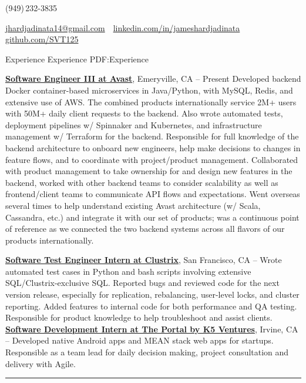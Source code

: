 \documentclass[letterpaper,MMMyyyy,nonstopmode]{simpleresumecv}
\makeatletter
\newcommand{\ResumeAuthor}{James Hardjadinata}
\newcommand{\ResumeWebsite}{github.com/SVT125}
\newcommand{\ResumeLinkedin}{linkedin.com/in/jameshardjadinata}
\newcommand{\ResumeEmail}{jhardjadinata14@gmail.com}
\makeatother
\begin{document}

\Title{\ResumeAuthor}
\begin{SubTitle}
	(949)\,232-3835
	\par
	\href{mailto:\ResumeEmail}
	{\ResumeEmail}
	\,\textbullet\,
	\href{\ResumeLinkedin}
	{\url{\ResumeLinkedin}}\,
	\,\textbullet\,
	\href{\ResumeWebsite}
	{\url{\ResumeWebsite}}
\end{SubTitle}

\begin{Body}


	\Section
	{Experience}
	{Experience}
	{PDF:Experience}

	\Entry
	\href{https://www.locationlabs.com/}
	{\textbf{Software Engineer III at Avast}},
	Emeryville, CA
	\hfill
	 --
	Present
	\Gap
	\BulletItem Developed backend Docker container-based microservices in Java/Python, with MySQL, Redis, and extensive use of AWS. The combined products internationally service 2M+ users with 50M+ daily client requests to the backend.
	\BulletItem Also wrote automated tests, deployment pipelines w/ Spinnaker and Kubernetes, and infrastructure management w/ Terraform for the backend.
	\BulletItem Responsible for full knowledge of the backend architecture to onboard new engineers, help make decisions to changes in feature flows, and to coordinate with project/product management.
	\BulletItem Collaborated with product management to take ownership for and design new features in the backend, worked with other backend teams to consider scalability as well as frontend/client teams to communicate API flows and expectations.
	\BulletItem Went overseas several times to help understand existing Avast architecture (w/ Scala, Cassandra, etc.) and integrate it with our set of products; was a continuous point of reference as we connected the two backend systems across all flavors of our products internationally.
	\newline

	\Entry
	\href{http://www.clustrix.com/}
	{\textbf{Software Test Engineer Intern at Clustrix}},
	San Francisco, CA
	\hfill
	 --
	\Gap
	\BulletItem Wrote automated test cases in Python and bash scripts involving extensive SQL/Clustrix-exclusive SQL.
	\BulletItem Reported bugs and reviewed code for the next version release, especially for replication, rebalancing, user-level locks, and cluster reporting.
	\BulletItem Added features to internal code for both performance and QA testing. 
	\BulletItem Responsible for product knowledge to help troubleshoot and assist clients.
	\newline
	\Entry
	\href{http://www.theportal.io/}
	{\textbf{Software Development Intern at The Portal by K5 Ventures}},
	Irvine, CA
	\hfill
	 --
	\Gap
	\BulletItem Developed native Android apps and MEAN stack web apps for startups.
	\BulletItem Responsible as a team lead for daily decision making, project consultation and delivery with Agile.\newline
	\hrule


\end{Body}
\end{document}

